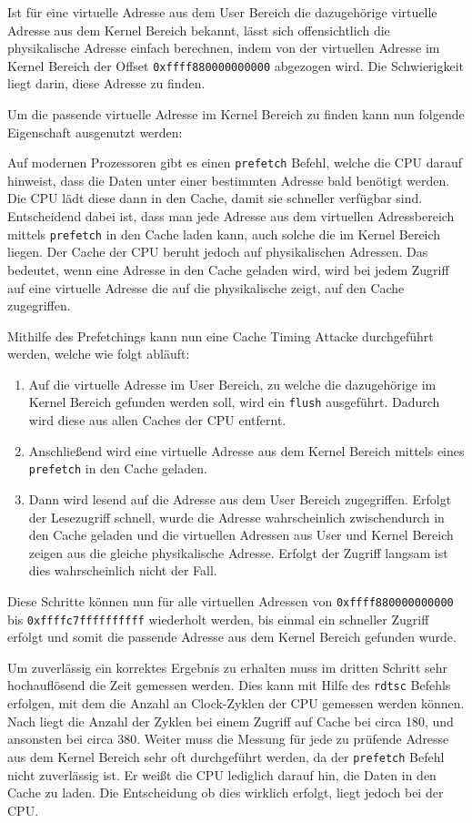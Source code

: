 \documentclass[conference]{IEEEtran}
\begin{document}
Ist für eine virtuelle Adresse aus dem User Bereich die dazugehörige virtuelle Adresse aus dem Kernel Bereich bekannt, lässt sich offensichtlich die physikalische Adresse einfach berechnen, indem von der virtuellen Adresse im Kernel Bereich der Offset \texttt{0xffff880000000000} abgezogen wird. Die Schwierigkeit liegt darin, diese Adresse zu finden. 


Um die passende virtuelle Adresse im Kernel Bereich zu finden kann nun folgende Eigenschaft ausgenutzt werden:

Auf modernen Prozessoren gibt es einen \texttt{prefetch} Befehl, welche die CPU darauf hinweist, dass die Daten unter einer bestimmten Adresse bald benötigt werden. Die CPU lädt diese dann in den Cache, damit sie schneller verfügbar sind. Entscheidend dabei ist, dass man jede Adresse aus dem virtuellen Adressbereich mittels \texttt{prefetch} in den Cache laden kann, auch solche die im Kernel Bereich liegen. Der Cache der CPU beruht jedoch auf physikalischen Adressen. Das bedeutet, wenn eine Adresse in den Cache geladen wird, wird bei jedem Zugriff auf eine virtuelle Adresse die auf die physikalische zeigt, auf den Cache zugegriffen.

Mithilfe des Prefetchings kann nun eine Cache Timing Attacke durchgeführt werden, welche wie folgt abläuft:
\begin{enumerate}
	\item Auf die virtuelle Adresse im User Bereich, zu welche die dazugehörige im Kernel Bereich gefunden werden soll, wird ein \texttt{flush} ausgeführt. Dadurch wird diese aus allen Caches der CPU entfernt. 
	\item Anschließend wird eine virtuelle Adresse aus dem Kernel Bereich mittels eines \texttt{prefetch} in den Cache geladen.
	\item Dann wird lesend auf die Adresse aus dem User Bereich zugegriffen. Erfolgt der Lesezugriff schnell, wurde die Adresse wahrscheinlich zwischendurch in den Cache geladen und die virtuellen Adressen aus User und Kernel Bereich zeigen aus die gleiche physikalische Adresse. Erfolgt der Zugriff langsam ist dies wahrscheinlich nicht der Fall.
\end{enumerate}

Diese Schritte können nun für alle virtuellen Adressen von \texttt{0xffff880000000000} bis \texttt{0xffffc7ffffffffff} wiederholt werden, bis einmal ein schneller Zugriff erfolgt und somit die passende Adresse aus dem Kernel Bereich gefunden wurde.

Um zuverlässig ein korrektes Ergebnis zu erhalten muss im dritten Schritt sehr hochauflösend die Zeit gemessen werden. Dies kann mit Hilfe des \texttt{rdtsc} Befehls erfolgen, mit dem die Anzahl an Clock-Zyklen der CPU gemessen werden können. Nach \cite{DBLP:conf/ccs/2016} liegt die Anzahl der Zyklen bei einem Zugriff auf Cache bei circa 180, und ansonsten bei circa 380.
Weiter muss die Messung für jede zu prüfende Adresse aus dem Kernel Bereich sehr oft durchgeführt werden, da der \texttt{prefetch} Befehl nicht zuverlässig ist. Er weißt die CPU lediglich darauf hin, die Daten in den Cache zu laden. Die Entscheidung ob dies wirklich erfolgt, liegt jedoch bei der CPU.
\end{document}
